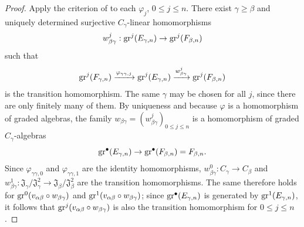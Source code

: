 \begin{proof}
Apply the criterion of  to each $\varphi_j$, $0\leq j\leq n$.
There exist $\gamma\geq\beta$ and uniquely determined surjective $C_\gamma$-linear homomorphisms
\[
  w_{\beta\gamma}^j:\operatorname{gr}^j(E_{\gamma,n})\to\operatorname{gr}^j(F_{\beta,n})
\]
such that
\[
  \operatorname{gr}^j(F_{\gamma,n})\xrightarrow{\varphi_{\gamma\gamma,j}}\operatorname{gr}^j(E_{\gamma,n})\xrightarrow{w_{\beta\gamma}^j}\operatorname{gr}^j(F_{\beta,n})
\]
is the transition homomorphism.
The same $\gamma$ may be chosen for all $j$, since there are only finitely many of them.
By uniqueness and because $\varphi$ is a homomorphism of graded algebras, the family
$w_{\beta\gamma}=(w_{\beta\gamma}^j)_{0\leq j\leq n}$ is a homomorphism of graded $C_\gamma$-algebras
\[
  \operatorname{gr}^\bullet(E_{\gamma,n})\to\operatorname{gr}^\bullet(F_{\beta,n})=F_{\beta,n}.
\]
Since $\varphi_{\gamma\gamma,0}$ and $\varphi_{\gamma\gamma,1}$ are the identity homomorphisms,
$w_{\beta\gamma}^0:C_\gamma\to C_\beta$ and
$w_{\beta\gamma}^1:\mathfrak{J}_\gamma/\mathfrak{J}_\gamma^2
\to\mathfrak{J}_\beta/\mathfrak{J}_\beta^2$ are the transition homomorphisms.
The same therefore holds for
$\operatorname{gr}^0(v_{\alpha\beta}\circ w_{\beta\gamma})$ and
$\operatorname{gr}^1(v_{\alpha\beta}\circ w_{\beta\gamma})$; since
$\operatorname{gr}^\bullet(E_{\gamma,n})$ is generated by $\operatorname{gr}^1(E_{\gamma,n})$, it follows that
$\operatorname{gr}^j(v_{\alpha\beta}\circ w_{\beta\gamma})$ is also the transition homomorphism for $0\leq j\leq n$.


\end{proof}
